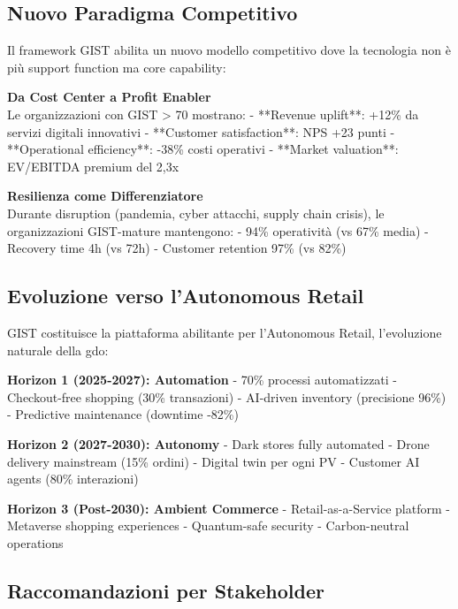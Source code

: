 \subsection{\texorpdfstring{Nuovo Paradigma Competitivo}{5.5.1 - Nuovo Paradigma}}
\label{subsec:5.5.1}

Il framework GIST abilita un nuovo modello competitivo dove la tecnologia non è più support function ma core capability:

\textbf{Da Cost Center a Profit Enabler}\\
Le organizzazioni con GIST > 70 mostrano:
- **Revenue uplift**: +12\% da servizi digitali innovativi
- **Customer satisfaction**: NPS +23 punti
- **Operational efficiency**: -38\% costi operativi
- **Market valuation**: EV/EBITDA premium del 2,3x

\textbf{Resilienza come Differenziatore}\\
Durante disruption (pandemia, cyber attacchi, supply chain crisis), le organizzazioni GIST-mature mantengono:
- 94\% operatività (vs 67\% media)
- Recovery time 4h (vs 72h)
- Customer retention 97\% (vs 82\%)

\subsection{\texorpdfstring{Evoluzione verso l'Autonomous Retail}{5.5.2 - Autonomous Retail}}
\label{subsec:5.5.2}

GIST costituisce la piattaforma abilitante per l'Autonomous Retail, l'evoluzione naturale della \gls{gdo}:

\textbf{Horizon 1 (2025-2027): Automation}
- 70\% processi automatizzati
- Checkout-free shopping (30\% transazioni)
- AI-driven inventory (precisione 96\%)
- Predictive maintenance (downtime -82\%)

\textbf{Horizon 2 (2027-2030): Autonomy}
- Dark stores fully automated
- Drone delivery mainstream (15\% ordini)
- Digital twin per ogni PV
- Customer AI agents (80\% interazioni)

\textbf{Horizon 3 (Post-2030): Ambient Commerce}
- Retail-as-a-Service platform
- Metaverse shopping experiences
- Quantum-safe security
- Carbon-neutral operations

\subsection{\texorpdfstring{Raccomandazioni per Stakeholder}{5.5.3 - Raccomandazioni}}
\label{subsec:5.5.3}

